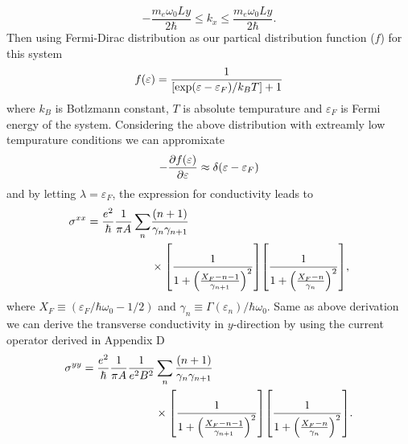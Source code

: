\begin{equation} \label{eq_30}
 -\frac{m_e\omega_0 Ly}{2\hbar} \leq k_x \leq \frac{m_e\omega_0 Ly}{2\hbar}.
\end{equation}
Then using Fermi-Dirac distribution as our partical distribution function ($f$) for this system
\begin{equation} \label{eq_31}
  f(\varepsilon) = \frac{1}{\qty[\exp(\varepsilon - \varepsilon_F)/k_B T]+1}
\end{equation}
where $k_B$ is Botlzmann constant, $T$ is absolute tempurature and $\varepsilon_F$ is Fermi energy of the system. Considering the above distribution with extreamly low tempurature conditions we can appromixate
\begin{equation} \label{eq_32}
  - \pdv{f(\varepsilon)}{\varepsilon} \approx \delta(\varepsilon - \varepsilon_F)
\end{equation}
and by letting $\lambda = \varepsilon_F$, the expression for conductivity leads to
\begin{equation} \label{eq_33}
  \begin{aligned}
    {\sigma}^{xx}  =
    \frac{e^2}{\hbar}
    \frac{1}{\pi A}
    \sum_{n} &
    \frac{\qty(n+1)}{\gamma_{n}\gamma_{n+1}} \\
    &\times
    \qty[
      \frac{1}
      {
        1 + \qty(\frac{X_F - n -1}{\gamma_{n+1}})^2
      }
    ]
    \qty[
      \frac{1}
      {
        1 + \qty(\frac{X_F - n}{\gamma_{n}})^2
      }
    ],
  \end{aligned}
\end{equation}
where $X_F \equiv ({\varepsilon_F}/{\hbar \omega_0} - {1}/{2})$
and
$\gamma_n \equiv {\Gamma(\varepsilon_n)}/{\hbar \omega_0}$.
Same as above derivation we can derive the transverse conductivity in $y$-direction by using the current operator derived in Appendix D
\begin{equation} \label{eq_34}
  \begin{aligned}
    {\sigma}^{yy} =
    \frac{e^2}{\hbar}
    \frac{1}{\pi A}
    \frac{1}{e^2B^2} &
    \sum_{n}
    \frac{\qty(n+1)}{\gamma_{n}\gamma_{n+1}} \\
    & \times
    \qty[
      \frac{1}
      {
        1 + \qty(\frac{X_F - n -1}{\gamma_{n+1}})^2
      }
    ]
    \qty[
      \frac{1}
      {
        1 + \qty(\frac{X_F - n}{\gamma_{n}})^2
      }
    ].
  \end{aligned}
\end{equation}
